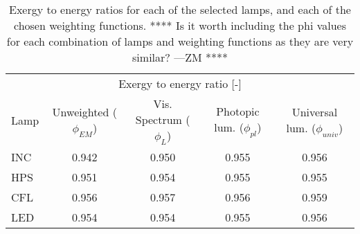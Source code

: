 

\begin{table}
\centering %
\caption{Exergy to energy ratios for each of the selected lamps, and each of the chosen weighting functions. **** Is it worth including the phi values for each combination of lamps and weighting functions as they are very similar? ---ZM ****}
\begin{tabular}{l c c c c}
\hline
\multicolumn{5}{c}{Exergy to energy ratio [-]} \\
\cline{2-5}
  Lamp 
      & Unweighted ($\phi_{EM}$)
      & Vis. Spectrum ($\phi_{L}$)
      & Photopic lum. ($\phi_{pl}$)
      & Universal lum. ($\phi_{univ}$)  \\
\hline
  INC & 0.942 & 0.950 & 0.955 & 0.956 \\
  HPS & 0.951 & 0.954 & 0.955 & 0.955 \\
  CFL & 0.956 & 0.957 & 0.956 & 0.959 \\
  LED & 0.954 & 0.954 & 0.955 & 0.956 \\
\hline
\end{tabular}
\label{tab:results_phi}
\end{table}